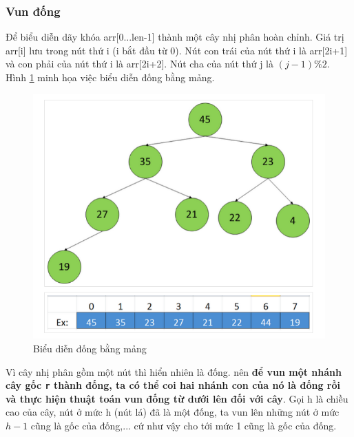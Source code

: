 \documentclass[8pt, a4paper]{article}
\begin{document}
\subsubsection{Vun đống}

Để biểu diễn dãy khóa arr[0...len-1] thành một cây nhị phân hoàn chỉnh. Giá trị arr[i] lưu trong nút thứ i (i bắt đầu từ 0). Nút con trái của nút thứ i là arr[2i+1] và con phải của nút thứ i là arr[2i+2]. Nút cha của nút thứ j là $(j-1) \% 2$. Hình \ref{mangdong} minh họa việc biểu diễn đống bằng mảng.
\begin{figure}[htp]
\centering
\includegraphics[scale=0.40]{img/bddong.png}
\caption{Biểu diễn đống bằng mảng}
\label{mangdong}
\end{figure}

Vì cây nhị phân gồm một nút thì hiển nhiên là đống. nên \textbf{để vun một nhánh cây gốc \texttt{r} thành đống, ta có thể coi hai nhánh con của nó là đống rồi và thực hiện thuật toán vun đống từ dưới lên đối với cây}. Gọi h là chiều cao của cây, nút ở mức h (nút lá) đã là một đống, ta vun lên những nút ở mức $h-1$ cũng là gốc của đống,... cứ như vậy cho tới mức 1 cũng là gốc của đống.
\end{document}

